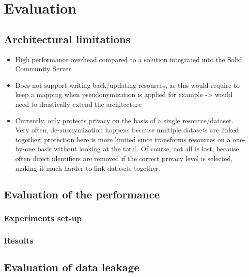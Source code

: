 \chapter{Evaluation}
\label{cha:evaluation}
\section{Architectural limitations}
\begin{itemize}
    \item High performance overhead compared to a solution integrated into the Solid Community Server
    \item Does not support writing back/updating resources, as this would require to keep a mapping when pseudonymization is applied for example -> would need to drastically extend the architecture
    \item Currently, only protects privacy on the basis of a single resource/dataset. Very often, de-anonymization happens because multiple datasets are linked together; protection here is more limited since \middleware{} transforms resources on a one-by-one basis without looking at the total. Of course, not all is lost, because often direct identifiers are removed if the correct privacy level is selected, making it much harder to link datasets together.
    
\end{itemize}
\section{Evaluation of the performance}
\subsection{Experiments set-up}
\subsection{Results}
\section{Evaluation of data leakage}